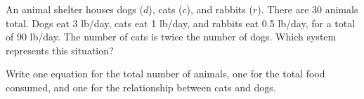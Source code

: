 \documentclass{ximera}
\begin{document}
\begin{problem}
An animal shelter houses dogs ($d$), cats ($c$), and rabbits ($r$). There are 30 animals total. Dogs eat 3 lb/day, cats eat 1 lb/day, and rabbits eat 0.5 lb/day, for a total of 90 lb/day. The number of cats is twice the number of dogs. Which system represents this situation?
\begin{hint}
Write one equation for the total number of animals, one for the total food consumed, and one for the relationship between cats and dogs.
\end{hint}
\begin{multipleChoice}
\end{multipleChoice}
\end{problem}
\end{document}
